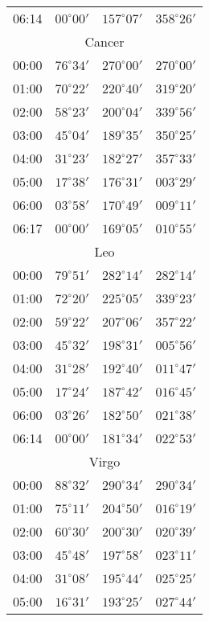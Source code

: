 \begin{table}
\begin{Parallel}{}{}
{{\begin{tabular}{l|lll}
06:14 & $00^\circ 00'$ & $157^\circ 07'$& $358^\circ 26'$ \\
\multicolumn{4}{c}{Cancer}\\
00:00 & $76^\circ 34'$ & $270^\circ 00'$& $270^\circ 00'$ \\
01:00 & $70^\circ 22'$ & $220^\circ 40'$& $319^\circ 20'$ \\
02:00 & $58^\circ 23'$ & $200^\circ 04'$& $339^\circ 56'$ \\
03:00 & $45^\circ 04'$ & $189^\circ 35'$& $350^\circ 25'$ \\
04:00 & $31^\circ 23'$ & $182^\circ 27'$& $357^\circ 33'$ \\
05:00 & $17^\circ 38'$ & $176^\circ 31'$& $003^\circ 29'$ \\
06:00 & $03^\circ 58'$ & $170^\circ 49'$& $009^\circ 11'$ \\
06:17 & $00^\circ 00'$ & $169^\circ 05'$& $010^\circ 55'$ \\
\multicolumn{4}{c}{Leo}\\
00:00 & $79^\circ 51'$ & $282^\circ 14'$& $282^\circ 14'$ \\
01:00 & $72^\circ 20'$ & $225^\circ 05'$& $339^\circ 23'$ \\
02:00 & $59^\circ 22'$ & $207^\circ 06'$& $357^\circ 22'$ \\
03:00 & $45^\circ 32'$ & $198^\circ 31'$& $005^\circ 56'$ \\
04:00 & $31^\circ 28'$ & $192^\circ 40'$& $011^\circ 47'$ \\
05:00 & $17^\circ 24'$ & $187^\circ 42'$& $016^\circ 45'$ \\
06:00 & $03^\circ 26'$ & $182^\circ 50'$& $021^\circ 38'$ \\
06:14 & $00^\circ 00'$ & $181^\circ 34'$& $022^\circ 53'$ \\
\multicolumn{4}{c}{Virgo}\\
00:00 & $88^\circ 32'$ & $290^\circ 34'$& $290^\circ 34'$ \\
01:00 & $75^\circ 11'$ & $204^\circ 50'$& $016^\circ 19'$ \\
02:00 & $60^\circ 30'$ & $200^\circ 30'$& $020^\circ 39'$ \\
03:00 & $45^\circ 48'$ & $197^\circ 58'$& $023^\circ 11'$ \\
04:00 & $31^\circ 08'$ & $195^\circ 44'$& $025^\circ 25'$ \\
05:00 & $16^\circ 31'$ & $193^\circ 25'$& $027^\circ 44'$ \\
\end{tabular}
}}
\ParallelRText{{\small
}}
\end{Parallel}
\end{table}
